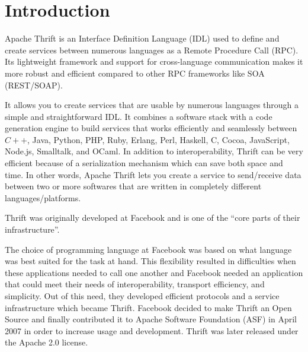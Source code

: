 \documentclass[9pt,twocolumn,twoside]{../../styles/osajnl}
\begin{document}
\section{Introduction}
Apache Thrift is an Interface Definition Language \cite{www-thrift-idl} (IDL) used to define and create services between numerous languages as a Remote Procedure Call (RPC). Its lightweight framework and support for cross-language communication makes \GE it more robust and efficient compared to other RPC frameworks like SOA \cite{blog-thrift} (REST/SOAP).


It allows you to create services that are usable by numerous languages through a simple and straightforward IDL. It combines a software stack with a code generation engine to build services that works efficiently and seamlessly between $C++$, Java, Python, PHP, Ruby, Erlang, Perl, Haskell, C, Cocoa, JavaScript, Node.js, Smalltalk, and OCaml. In addition to interoperability, Thrift can be very efficient because of a serialization mechanism \cite{git-thrift-serial} which can save both space and time. In other words, Apache Thrift lets you create a service to send/receive data between two or more softwares that are written in completely different languages/platforms. \\


Thrift was originally developed at Facebook and is one of the “core parts of their infrastructure”.


The choice of programming language at Facebook was based on what language was best suited for the task at hand. This flexibility resulted in difficulties when these applications needed to call one another and Facebook needed an application that could meet their needs of interoperability, transport efficiency, and simplicity. Out of this need, they developed efficient protocols and a service infrastructure which became Thrift. Facebook decided to make Thrift an Open Source and finally contributed it to Apache Software Foundation (ASF) in April 2007 in order to increase usage and development. Thrift was later released under the Apache 2.0 license.
\end{document}
